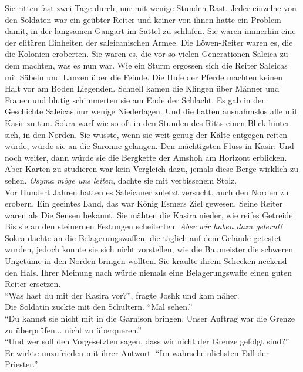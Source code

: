 Sie ritten fast zwei Tage durch, nur mit wenige Stunden Rast. Jeder einzelne von den Soldaten war 
ein geübter Reiter und keiner von ihnen hatte ein Problem damit, in der langsamen Gangart im Sattel 
zu schlafen. Sie waren immerhin eine der elitären Einheiten der saleicanischen Armee. Die 
Löwen-Reiter waren es, die die Kolonien eroberten. Sie waren es, die vor so vielen Generationen 
Saleica zu dem machten, was es nun war. Wie ein Sturm ergossen sich die Reiter Saleicas mit 
Säbeln und Lanzen über die Feinde. Die Hufe der Pferde machten keinen Halt vor am Boden 
Liegenden. Schnell kamen die Klingen über Männer und Frauen und blutig schimmerten sie am Ende 
der Schlacht. Es gab in der Geschichte Saleicas nur wenige Niederlagen. Und die hatten ausnahmslos 
alle mit Kasir zu tun. Sokra warf wie so oft in den Stunden des Ritts einen Blick hinter sich, in 
den Norden. Sie wusste, wenn sie weit genug der Kälte entgegen reiten würde, würde sie an die 
Saronne gelangen. Den mächtigsten Fluss in Kasir. Und noch weiter, dann würde sie die Bergkette der 
Amshoh am Horizont erblicken. Aber Karten zu studieren war kein Vergleich dazu, jemals diese Berge 
wirklich zu sehen. \textit{Osyma möge uns leiten}, dachte sie mit verbissenem Stolz.\\
Vor Hundert Jahren hatten es Saleicaner zuletzt versucht, auch den Norden zu erobern. Ein geeintes 
Land, das war König Esmers Ziel gewesen. Seine Reiter waren als Die Sensen bekannt. Sie mähten die 
Kasira nieder, wie reifes Getreide. Bis sie an den steinernen Festungen scheiterten. \textit{Aber 
wir haben dazu gelernt!}\\
Sokra dachte an die Belagerungswaffen, die täglich auf dem Gelände getestet wurden, jedoch 
konnte sie sich nicht vorstellen, wie die Baumeister die schweren Ungetüme in den Norden bringen 
wollten. Sie kraulte ihrem Schecken neckend den Hals. Ihrer Meinung nach würde niemals eine 
Belagerungswaffe einen guten Reiter ersetzen.\\
``Was hast du mit der Kasira vor?'', fragte Joshk und kam näher.\\
Die Soldatin zuckte mit den Schultern. ``Mal sehen.''\\
``Du kannst sie nicht mit in die Garnison bringen. Unser Auftrag war die Grenze zu überprüfen... 
nicht zu überqueren.''\\
``Und wer soll den Vorgesetzten sagen, dass wir nicht der Grenze gefolgt sind?''\\
Er wirkte unzufrieden mit ihrer Antwort. ``Im wahrscheinlichsten Fall der Priester.''\\
